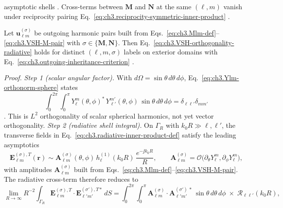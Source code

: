 asymptotic shells \cite{hansen1988}. Cross-terms between \(\mathbf{M}\) and \(\mathbf{N}\) at the same
\((\ell,m)\) vanish under reciprocity pairing Eq.~\eqref{eq:ch3.reciprocity-symmetric-inner-product}
\cite{stratton1941}.
\begin{theorem}
\label{thm:ch3.vsh-orthogonality}
Let \(\mathbf{u}_{\ell m}^{(\sigma)}\) be outgoing harmonic pairs built from
Eqs.~\eqref{eq:ch3.Mlm-def}--\eqref{eq:ch3.VSH-M-pair} with \(\sigma\in\{\mathbf{M},\mathbf{N}\}\). Then
Eq.~\eqref{eq:ch3.VSH-orthogonality-radiative} holds for distinct \((\ell,m,\sigma)\) labels on exterior domains
with Eq.~\eqref{eq:ch3.outgoing-inheritance-criterion} \cite{stratton1941}.
\end{theorem}
\noindent\textit{Proof.}
\emph{Step 1 (scalar angular factor).} With $d\Omega=\sin\theta\,d\theta\,d\phi$,
Eq.~\eqref{eq:ch3.Ylm-orthonorm-sphere} states
\begin{equation}
\label{eq:ch3.Ylm-angular-integral-display}
\int_{0}^{2\pi}\!\int_{0}^{\pi}
Y_{\ell}^{m}(\theta,\phi)^{*}\,
Y_{\ell'}^{m'}(\theta,\phi)\,
\sin\theta\,d\theta\,d\phi
=
\delta_{\ell\ell'}\delta_{mm'}
\end{equation}
\cite{jackson1999}. This is $L^{2}$ orthogonality of scalar spherical harmonics, not yet vector orthogonality.
\emph{Step 2 (radiative shell integral).} On $\Gamma_R$ with $k_0 R\gg\ell,\ell'$, the transverse fields in
Eq.~\eqref{eq:ch3.radiative-inner-product-def} satisfy the leading asymptotics \cite{hansen1988,stratton1941}
\begin{equation}
\label{eq:ch3.far-shell-ET-leading}
\mathbf{E}_{\ell m}^{(\sigma),T}(\mathbf{r})
\sim
\mathbf{A}_{\ell m}^{(\sigma)}(\theta,\phi)\,
h_{\ell}^{(1)}(k_0 R)\,
\frac{e^{-\jj k_0 R}}{R},
\qquad
\mathbf{A}_{\ell m}^{(\sigma)}
=\mathcal{O}\!\big(\partial_\theta Y_{\ell}^{m},\partial_\phi Y_{\ell}^{m}\big),
\end{equation}
with amplitudes $\mathbf{A}_{\ell m}^{(\sigma)}$ built from Eqs.~\eqref{eq:ch3.Mlm-def}--\eqref{eq:ch3.VSH-M-pair}.
The radiative cross-term therefore reduces to
\begin{equation}
\label{eq:ch3.shell-ET-orthogonality-display}
\lim_{R\to\infty}R^{-2}
\int_{\Gamma_R}
\mathbf{E}_{\ell m}^{(\sigma),T}\cdot\mathbf{E}_{\ell' m'}^{(\sigma'),T*}\,dS
=
\int_{0}^{2\pi}\!\int_{0}^{\pi}
\mathbf{A}_{\ell m}^{(\sigma)}\cdot\mathbf{A}_{\ell' m'}^{(\sigma')\,*}
\,\sin\theta\,d\theta\,d\phi
\;\times\;
\mathcal{R}_{\ell\ell'}(k_0 R),
\end{equation}
